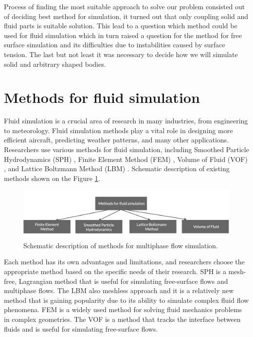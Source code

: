 Process of finding the most suitable approach to solve our problem consisted out of deciding best method for simulation, it turned out that only coupling solid and fluid parts is suitable solution. This lead to a question which method could be used for fluid simulation which in turn raised a question for the method for free surface simulation and its difficulties due to instabilities caused by surface tension. The last but not least it was necessary to decide how we will simulate solid and arbitrary shaped bodies.

\section{Methods for fluid simulation}

Fluid simulation is a crucial area of research in many industries, from engineering to meteorology. Fluid simulation methods play a vital role in designing more efficient aircraft, predicting weather patterns, and many other applications. Researchers use various methods for fluid simulation, including Smoothed Particle Hydrodynamics (SPH) \cite{gingold1977SPH, monaghan1994SPH} , Finite Element Method (FEM) \cite{lewis2004fundamentals}, Volume of Fluid (\ac{VOF}) \cite{hirt1981volume}, and Lattice Boltzmann Method (LBM) \cite{chen1998lattice}. Schematic description of existing methods shown on the Figure \ref{fig:methods_for_fluids}.
\begin{figure}[!ht]
    \centering
    \includegraphics[width=15cm]{GWU_Thesis_Sarmakeeva/Images/chap1/methods_for_fluids.png}
    \caption{Schematic description of methods for multiphase flow simulation.}
    \label{fig:methods_for_fluids}
\end{figure}
Each method has its own advantages and limitations, and researchers choose the appropriate method based on the specific needs of their research. SPH is a mesh-free, Lagrangian method that is useful for simulating free-surface flows and multiphase flows. The LBM also meshless approach and it is a relatively new method that is gaining popularity due to its ability to simulate complex fluid flow phenomena. FEM is a widely used method for solving fluid mechanics problems in complex geometries. The VOF is a method that tracks the interface between fluids and is useful for simulating free-surface flows.


